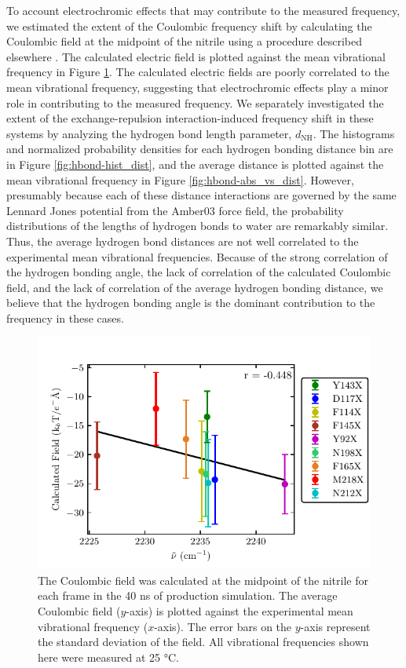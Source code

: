 To account electrochromic effects that may contribute to the measured frequency, we estimated the extent of the Coulombic frequency shift by calculating the Coulombic field at the midpoint of the nitrile using a procedure described elsewhere \cite{Ensign2011}.
The calculated electric field is plotted against the mean vibrational frequency in Figure \ref{fig:hbond-forces}.
The calculated electric fields are poorly correlated to the mean vibrational frequency, suggesting that electrochromic effects play a minor role in contributing to the measured frequency.
We separately investigated the extent of the exchange-repulsion interaction-induced frequency shift in these systems by analyzing the hydrogen bond length parameter, $d_{\text{NH}}$.
The histograms and normalized probability densities for each hydrogen bonding distance bin are in Figure \ref{fig:hbond-hist_dist}, and the average distance is plotted against the mean vibrational frequency in Figure \ref{fig:hbond-abs_vs_dist}.
However, presumably because each of these distance interactions are governed by the same Lennard Jones potential from the Amber03 force field, the probability distributions of the lengths of hydrogen bonds to water are remarkably similar.
Thus, the average hydrogen bond distances are not well correlated to the experimental mean vibrational frequencies.
Because of the strong correlation of the hydrogen bonding angle, the lack of correlation of the calculated Coulombic field, and the lack of correlation of the average hydrogen bonding distance, we believe that the hydrogen bonding angle is the dominant contribution to the frequency in these cases.

\begin{figure}
    \center
    \includegraphics[width=\single]{figures-gfp-hbond/forces.pdf}
    \caption{
        The Coulombic field was calculated at the midpoint of the nitrile for each frame in the 40 ns of production simulation. 
        The average Coulombic field ($y$-axis) is plotted against the experimental mean vibrational frequency ($x$-axis). 
        The error bars on the $y$-axis represent the standard deviation of the field. 
        All vibrational frequencies shown here were measured at 25 \si{\celsius}.
    }
    \label{fig:hbond-forces}
\end{figure}

